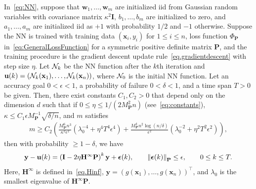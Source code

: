 \documentclass{article} %
\begin{document}
\begin{thm}\label{thm.decoupledmain}
In~\cref{eq:NN}, suppose that $\mathbf{w}_1,\ldots,\mathbf{w}_m$ are initialized iid from Gaussian random variables with covariance matrix $\kappa^2\mathbf{I}$, ${b}_1, \ldots, {b}_m$ are initialized to zero, and $a_1,\ldots,a_m$ are initialized iid as $+1$ with probability $1/2$ and $-1$ otherwise. Suppose the NN is trained with training data $(\mathbf{x}_i,y_i)$ for $1\leq i\leq n$, loss function $\Phi_{\mathbf{P}}$ in~\cref{eq:GeneralLossFunction} for a symmetric positive definite matrix $\mathbf{P}$, and the training procedure is the gradient descent update rule~\cref{eq.gradientdescent} with step size $\eta$. Let ${\mathcal{N}}_k$ be the NN function after the $k$th iteration and $\mathbf{u}(k) = ({\mathcal{N}}_k(\mathbf{x}_1), \ldots, {\mathcal{N}}_k(\mathbf{x}_n))$, where ${\mathcal{N}}_0$ is the initial NN function. Let an accuracy goal $0 < \epsilon < 1$, a probability of failure $0 < \delta < 1$, and a time span $T > 0$ be given. Then, there exist constants $C_1, C_2 > 0$ that depend only on the dimension $d$ such that if $0 \leq \eta \leq 1/(2M_{\mathbf{P}}^2n)$ (see~\cref{eq:constants}), $\kappa \leq C_1 \epsilon M_{\mathbf{P}}^{-1} \sqrt{\delta/n}$, and $m$ satisfies
\begin{equation}\label{eq.mkapparestriction}
    \begin{aligned}
    m \geq C_2\! \left(\!\frac{M_{\mathbf{P}}^6 n^3}{\kappa^2  \epsilon^2}\! \left(\lambda_0^{-4} \!+\! \eta^4 T^4 \epsilon^4\right) \!+\! \frac{M_{\mathbf{P}}^4 n^2 \log(n/\delta)}{\epsilon^2}\! \left(\lambda_0^{-2} \!+\! \eta^2 T^2 \epsilon^2\right)\!\!\right),
\end{aligned}
\end{equation}
then with probability $\geq 1 - \delta$, we have
\begin{equation}
    \mathbf{y} - \mathbf{u}(k) = \left(\mathbf{I} - 2\eta \mathbf{H}^\infty\mathbf{P}\right)^k \mathbf{y} + \boldsymbol{\epsilon}(k), \qquad \left\lVert\boldsymbol{\epsilon}(k)\right\rVert_{\mathbf{P}} \leq \epsilon, \qquad 0 \leq k \leq T.
\end{equation}
Here, $\mathbf{H}^\infty$ is defined in~\cref{eq.Hinf}, $\mathbf{y} \!=\! (g(\mathbf{x}_1), \ldots, g(\mathbf{x}_n))^\top$, and $\lambda_0$ is the smallest eigenvalue of $\mathbf{H}^\infty\mathbf{P}$.
\end{thm}
\end{document}

